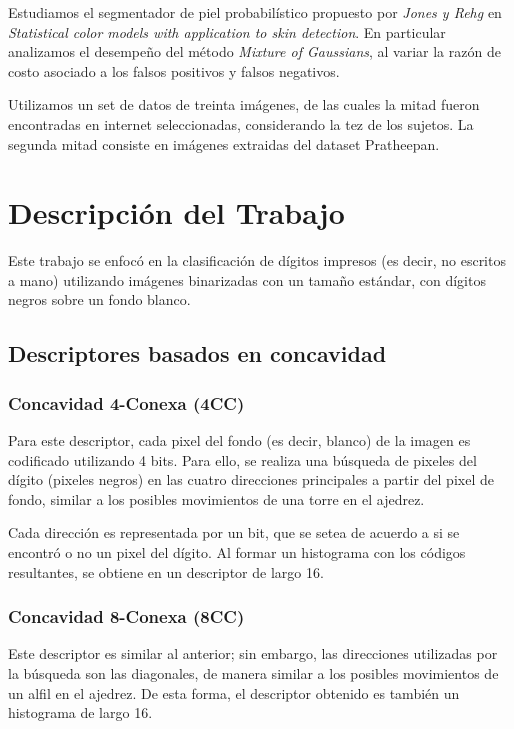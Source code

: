 \documentclass[12pt]{article}
\begin{document}
Estudiamos el segmentador de piel probabilístico propuesto por \emph{Jones y Rehg} en \emph{Statistical color models with application to skin detection}. En particular analizamos el desempeño del método \emph{Mixture of Gaussians}, al variar la razón de costo asociado a los falsos positivos y falsos negativos.

Utilizamos un set de datos de treinta imágenes, de las cuales la mitad fueron encontradas en internet seleccionadas, considerando la tez de los sujetos. La segunda mitad consiste en imágenes extraidas del dataset Pratheepan.



\section{Descripción del Trabajo}

Este trabajo se enfocó en la clasificación de dígitos impresos (es decir, no
escritos a mano) utilizando imágenes binarizadas con un tamaño estándar, con
dígitos negros sobre un fondo blanco.


\subsection{Descriptores basados en concavidad}

\subsubsection{Concavidad 4-Conexa (4CC)}

Para este descriptor, cada pixel del fondo (es decir, blanco) de la imagen es
codificado utilizando 4 bits. Para ello, se realiza una búsqueda de pixeles del
dígito (pixeles negros) en las cuatro direcciones principales a partir del pixel
de fondo, similar a los posibles movimientos de una torre en el ajedrez. 

Cada dirección es representada por un bit, que se setea de acuerdo a si se
encontró o no un pixel del dígito. Al formar un histograma con los códigos
resultantes, se obtiene en un descriptor de largo 16. 

\subsubsection{Concavidad 8-Conexa (8CC)}

Este descriptor es similar al anterior; sin embargo, las direcciones utilizadas
por la búsqueda son las diagonales, de manera similar a los posibles movimientos
de un alfil en el ajedrez. De esta forma, el descriptor obtenido es también un
histograma de largo 16.
\end{document}
